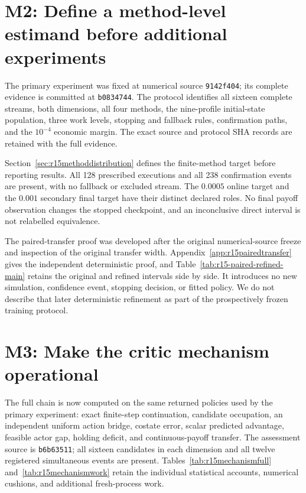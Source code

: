 \section*{M2: Define a method-level estimand before additional experiments}
The primary experiment was fixed at numerical source \texttt{9142f404}; its complete evidence is committed at \texttt{b0834744}. The protocol identifies all sixteen complete streams, both dimensions, all four methods, the nine-profile initial-state population, three work levels, stopping and fallback rules, confirmation paths, and the $10^{-4}$ economic margin. The exact source and protocol SHA records are retained with the full evidence.

Section~\ref{sec:r15methoddistribution} defines the finite-method target before reporting results. All 128 prescribed executions and all 238 confirmation events are present, with no fallback or excluded stream. The $0.0005$ online target and the $0.001$ secondary final target have their distinct declared roles. No final payoff observation changes the stopped checkpoint, and an inconclusive direct interval is not relabelled equivalence.

The paired-transfer proof was developed after the original numerical-source freeze and inspection of the original transfer width. Appendix~\ref{app:r15pairedtransfer} gives the independent deterministic proof, and Table~\ref{tab:r15-paired-refined-main} retains the original and refined intervals side by side. It introduces no new simulation, confidence event, stopping decision, or fitted policy. We do not describe that later deterministic refinement as part of the prospectively frozen training protocol.

\section*{M3: Make the critic mechanism operational}
The full chain is now computed on the same returned policies used by the primary experiment: exact finite-step continuation, candidate occupation, an independent uniform action bridge, costate error, scalar predicted advantage, feasible actor gap, holding deficit, and continuous-payoff transfer. The assessment source is \texttt{b6b63511}; all sixteen candidates in each dimension and all twelve registered simultaneous events are present. Tables~\ref{tab:r15mechanismfull} and~\ref{tab:r15mechanismwork} retain the individual statistical accounts, numerical cushions, and additional fresh-process work.

